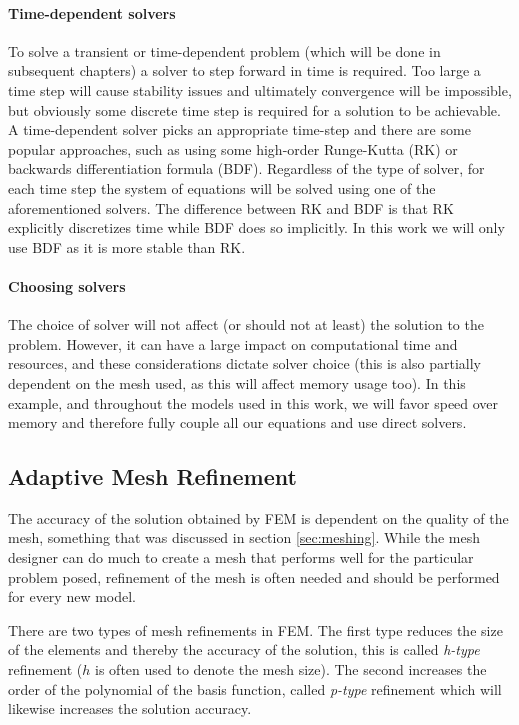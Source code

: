 \paragraph{Time-dependent solvers}
To solve a transient or time-dependent problem (which will be done in subsequent chapters) a solver to step forward in time is required.
Too large a time step will cause stability issues and ultimately convergence will be impossible, but obviously some discrete time step is required for a solution to be achievable.
A time-dependent solver picks an appropriate time-step and there are some popular approaches, such as using some high-order Runge-Kutta (RK) or backwards differentiation formula (BDF).
Regardless of the type of solver, for each time step the system of equations will be solved using one of the aforementioned solvers.
The difference between RK and BDF is that RK explicitly discretizes time while BDF does so implicitly.
In this work we will only use BDF as it is more stable than RK.\par

\paragraph{Choosing solvers}

The choice of solver will not affect (or should not at least) the solution to the problem.
However, it can have a large impact on computational time and resources, and these considerations dictate solver choice (this is also partially dependent on the mesh used, as this will affect memory usage too).
In this example, and throughout the models used in this work, we will favor speed over memory and therefore fully couple all our equations and use direct solvers.\par

\subsection{Adaptive Mesh Refinement}
The accuracy of the solution obtained by FEM is dependent on the quality of the mesh, something that was discussed in section \ref{sec:meshing}.
While the mesh designer can do much to create a mesh that performs well for the particular problem posed, refinement of the mesh is often needed and should be performed for every new model.\par

There are two types of mesh refinements in FEM.
The first type reduces the size of the elements and thereby the accuracy of the solution, this is called \textit{h-type} refinement ($h$ is often used to denote the mesh size).
The second increases the order of the polynomial of the basis function, called \textit{p-type} refinement which will likewise increases the solution accuracy.\par

